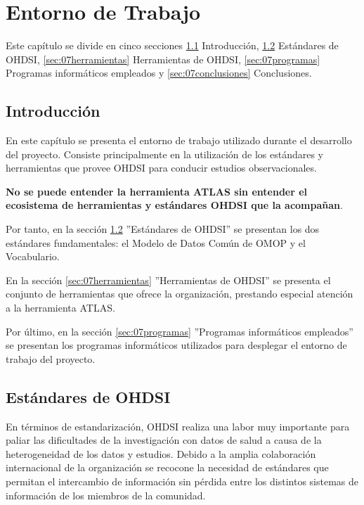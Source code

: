\chapter{Entorno de Trabajo}\label{cap:07entorno}
Este capítulo se divide en cinco secciones \ref{sec:07intro} Introducción, \ref{sec:07estandares} Estándares de OHDSI, \ref{sec:07herramientas} Herramientas de OHDSI, \ref{sec:07programas} Programas informáticos empleados y \ref{sec:07conclusiones} Conclusiones.

\section{Introducción}\label{sec:07intro}

En este capítulo se presenta el entorno de trabajo utilizado durante el desarrollo del proyecto. Consiste principalmente en la utilización de los estándares y herramientas que provee OHDSI para conducir estudios observacionales.

\textbf{No se puede entender la herramienta ATLAS sin entender el ecosistema de herramientas y estándares OHDSI que la acompañan}.

Por tanto, en la sección \ref{sec:07estandares} ''Estándares de OHDSI'' se presentan los dos estándares fundamentales: el Modelo de Datos Común de OMOP y el Vocabulario.

En la sección \ref{sec:07herramientas} ''Herramientas de OHDSI'' se presenta el conjunto de herramientas que ofrece la organización, prestando especial atención a la herramienta ATLAS.

Por último, en la sección \ref{sec:07programas} ''Programas informáticos empleados'' se presentan los programas informáticos utilizados para desplegar el entorno de trabajo del proyecto.


\section{Estándares de OHDSI}\label{sec:07estandares}


En términos de estandarización, OHDSI realiza una labor muy importante para paliar las dificultades de la investigación con datos de salud a causa de la heterogeneidad de los datos y estudios. Debido a la amplia colaboración internacional de la organización se recocone la necesidad de estándares que permitan el intercambio de información sin pérdida entre los distintos sistemas de información de los miembros de la comunidad.

